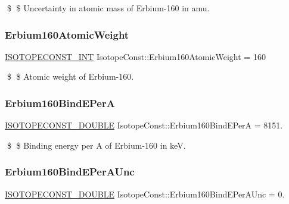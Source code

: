 \$ \$ Uncertainty in atomic mass of Erbium-\/160 in amu. \mbox{\label{group___isotope_const-_erbium-_er160_gae57ae87a922396ad154d681bd2a4a9cf}} 
\subsubsection{\texorpdfstring{Erbium160\+Atomic\+Weight}{Erbium160AtomicWeight}}
{\footnotesize\ttfamily \mbox{\hyperlink{group___isotope_const-_macros_ga5f18360b3e99483a35c32d789e62621c}{I\+S\+O\+T\+O\+P\+E\+C\+O\+N\+S\+T\+\_\+\+I\+NT}} Isotope\+Const\+::\+Erbium160\+Atomic\+Weight = 160}

\$ \$ Atomic weight of Erbium-\/160. \mbox{\label{group___isotope_const-_erbium-_er160_ga6bc2fa7eb10238dd5d0d135fb3d78bc7}} 
\subsubsection{\texorpdfstring{Erbium160\+Bind\+E\+PerA}{Erbium160BindEPerA}}
{\footnotesize\ttfamily \mbox{\hyperlink{group___isotope_const-_macros_ga8f45a7272ce02c0b4c65c44636ed719a}{I\+S\+O\+T\+O\+P\+E\+C\+O\+N\+S\+T\+\_\+\+D\+O\+U\+B\+LE}} Isotope\+Const\+::\+Erbium160\+Bind\+E\+PerA = 8151.}

\$ \$ Binding energy per A of Erbium-\/160 in keV. \mbox{\label{group___isotope_const-_erbium-_er160_ga39b9e4a4cbf08e0672135df92d2ff4bd}} 
\subsubsection{\texorpdfstring{Erbium160\+Bind\+E\+Per\+A\+Unc}{Erbium160BindEPerAUnc}}
{\footnotesize\ttfamily \mbox{\hyperlink{group___isotope_const-_macros_ga8f45a7272ce02c0b4c65c44636ed719a}{I\+S\+O\+T\+O\+P\+E\+C\+O\+N\+S\+T\+\_\+\+D\+O\+U\+B\+LE}} Isotope\+Const\+::\+Erbium160\+Bind\+E\+Per\+A\+Unc = 0.}

